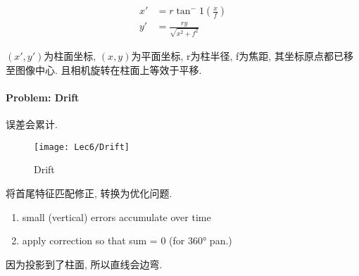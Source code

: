\begin{align*}
    x'&=r\tan^-1(\frac{x}{f})\\
    y'&=\frac{ry}{\sqrt{x^2+f^2}}
\end{align*}

$(x', y')$为柱面坐标, $(x, y)$为平面坐标, r为柱半径, f为焦距, 其坐标原点都已移至图像中心.  且相机旋转在柱面上等效于平移. 

\paragraph{Problem: Drift}

误差会累计. 
\begin{figure}[H]
    \centering
    \texttt{[image: Lec6/Drift]}
    \caption{Drift}
\end{figure}

将首尾特征匹配修正, 转换为优化问题. 
\begin{enumerate}
    \item small (vertical) errors accumulate over time
    \item apply correction so that sum = 0 (for 360° pan.)
\end{enumerate}

因为投影到了柱面, 所以直线会边弯. 
